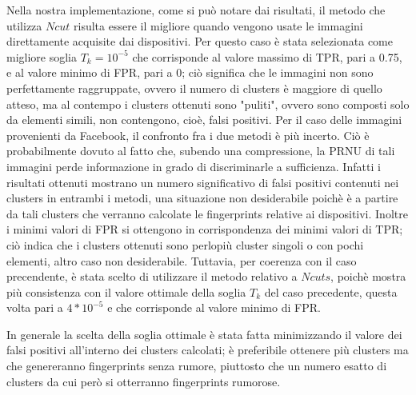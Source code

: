 Nella nostra implementazione, come si può notare dai risultati, il metodo che utilizza $Ncut$ risulta essere il migliore quando vengono usate le immagini direttamente acquisite dai dispositivi. Per questo caso è stata selezionata come migliore soglia $T_{k} = 10^{-5}$ che corrisponde al valore massimo di TPR, pari a 0.75, e al valore minimo di FPR, pari a 0; ciò significa che le immagini non sono perfettamente raggruppate, ovvero il numero di clusters è maggiore di quello atteso, ma al contempo i clusters ottenuti sono "puliti", ovvero sono composti solo da elementi simili, non contengono, cioè, falsi positivi.
Per il caso delle immagini provenienti da Facebook, il confronto fra i due metodi è più incerto. Ciò è probabilmente dovuto al fatto che, subendo una compressione, la PRNU di tali immagini perde informazione in grado di discriminarle a sufficienza. Infatti i risultati ottenuti mostrano un numero significativo di falsi positivi contenuti nei clusters in entrambi i metodi, una situazione non desiderabile poichè è a partire da tali clusters che verranno calcolate le fingerprints relative ai dispositivi. Inoltre i minimi valori di FPR si ottengono in corrispondenza dei minimi valori di TPR; ciò indica che i clusters ottenuti sono perlopiù cluster singoli o con pochi elementi, altro caso non desiderabile. Tuttavia, per coerenza con il caso precendente, è stata scelto di utilizzare il metodo relativo a $Ncuts$, poichè mostra più consistenza con il valore ottimale della soglia $T_{k}$ del caso precedente, questa volta pari a $4*10^{-5}$ e che corrisponde al valore minimo di FPR.

In generale la scelta della soglia ottimale è stata fatta minimizzando il valore dei falsi positivi all'interno dei clusters calcolati; è preferibile ottenere più clusters ma che genereranno fingerprints senza rumore, piuttosto che un numero esatto di clusters da cui però si otterranno fingerprints rumorose.
